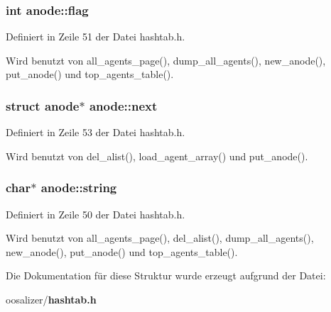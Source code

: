 \subsubsection{\setlength{\rightskip}{0pt plus 5cm}int {\bf anode::flag}}\label{structanode_f9635cb5d8af6707a8bfab885f6d556b}




Definiert in Zeile 51 der Datei hashtab.h.

Wird benutzt von all\_\-agents\_\-page(), dump\_\-all\_\-agents(), new\_\-anode(), put\_\-anode() und top\_\-agents\_\-table().
\subsubsection{\setlength{\rightskip}{0pt plus 5cm}struct {\bf anode}$\ast$ {\bf anode::next}}\label{structanode_834db38618dba5e74b8a738441e861d9}




Definiert in Zeile 53 der Datei hashtab.h.

Wird benutzt von del\_\-alist(), load\_\-agent\_\-array() und put\_\-anode().
\subsubsection{\setlength{\rightskip}{0pt plus 5cm}char$\ast$ {\bf anode::string}}\label{structanode_8fa6d7969583389ae6d535866f9fd914}




Definiert in Zeile 50 der Datei hashtab.h.

Wird benutzt von all\_\-agents\_\-page(), del\_\-alist(), dump\_\-all\_\-agents(), new\_\-anode(), put\_\-anode() und top\_\-agents\_\-table().

Die Dokumentation f\"{u}r diese Struktur wurde erzeugt aufgrund der Datei:\begin{CompactItemize}
\item 
oosalizer/{\bf hashtab.h}\end{CompactItemize}
